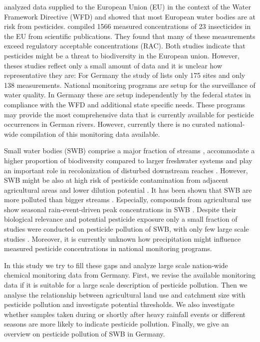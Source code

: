 \documentclass[journal=esthag,manuscript=article]{achemso}
\begin{document}
\citet{malaj_organic_2014} analyzed data supplied to the European Union (EU) in the context of the Water Framework Directive (WFD) and showed that most European water bodies are at risk from pesticides.
\citet{stehle_pesticide_2015} compiled 1566 measured concentrations of 23 insecticides in the EU from scientific publications. 
They found that many of these measurements exceed regulatory acceptable concentrations (RAC).
Both studies indicate that pesticides might be a threat to biodiversity in the European union. 
However, theses studies reflect only a small amount of data and it is unclear how representative they are:
For Germany the study of \citet{malaj_organic_2014} lists only 175 sites and \citet{stehle_pesticide_2015} only 138 measurements. %
National monitoring programs are setup for the surveillance of water quality.
In Germany these are setup independently by the federal states in compliance with the WFD \citep{quevauviller_water_2008} and additional state specific needs. 
These programs may provide the most comprehensive data that is currently available for pesticide occurrences in German rivers.
However, currently there is no curated national-wide compilation of this monitoring data available.

Small water bodies (SWB) comprise a major fraction of streams \citep{nadeau_hydrological_2007}, accommodate a higher proportion of biodiversity compared to larger freshwater systems \citep{davies_comparison_2008, biggs_report_2014} and play an important role in recolonization of disturbed downstream reaches \citep{liess_analyzing_2005, orlinskiy_forested_2015}.
However, SWB might be also at high risk of pesticide contamination from adjacent agricultural areas and lower dilution potential \citep{schulz_field_2004,liess_determination_1999}.
It has been shown that SWB are more polluted than bigger streams \citep{stehle_pesticide_2015,schulz_field_2004}.
Especially, compounds from agricultural use show seasonal rain-event-driven peak concentrations in SWB \citep{wittmer_significance_2010}.
Despite their biological relevance and potential pesticide exposure only a small fraction of studies were conducted on pesticide pollution of SWB, with only few large scale studies \citep{lorenz_specifics_2016}. 
Moreover, it is currently unknown how precipitation might influence measured pesticide concentrations in national monitoring programs.

In this study we try to fill these gaps and analyze large scale nation-wide chemical monitoring data from Germany.
First, we revise the available monitoring data if it is suitable for a large scale description of pesticide pollution.
Then we analyse the relationship between agricultural land use and catchment size with pesticide pollution and investigate potential thresholds.
We also investigate whether samples taken during or shortly after heavy rainfall events or different seasons are more likely to indicate pesticide pollution.
Finally, we give an overview on pesticide pollution of SWB in Germany.
\end{document}
